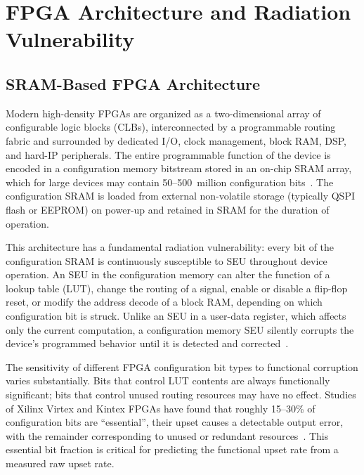 \section{FPGA Architecture and Radiation Vulnerability}
\label{sec:FPGA_arch}

\subsection{SRAM-Based FPGA Architecture}

Modern high-density FPGAs are organized as a two-dimensional array
of configurable logic blocks (CLBs), interconnected by a programmable
routing fabric and surrounded by dedicated I/O, clock management,
block RAM, DSP, and hard-IP peripherals.  The entire programmable
function of the device is encoded in a configuration memory bitstream
stored in an on-chip SRAM array, which for large devices may contain
50--500~million configuration bits~\cite{kuon2008fpga}.  The
configuration SRAM is loaded from external non-volatile storage
(typically QSPI flash or EEPROM) on power-up and retained in SRAM
for the duration of operation.

This architecture has a fundamental radiation vulnerability: every
bit of the configuration SRAM is continuously susceptible to SEU
throughout device operation.  An SEU in the configuration memory
can alter the function of a lookup table (LUT), change the routing
of a signal, enable or disable a flip-flop reset, or modify the
address decode of a block RAM, depending on which configuration
bit is struck.  Unlike an SEU in a user-data register, which affects
only the current computation, a configuration memory SEU silently
corrupts the device's programmed behavior until it is detected and
corrected~\cite{kastensmidt2014survey}.

The sensitivity of different FPGA configuration bit types to
functional corruption varies substantially.  Bits that control
LUT contents are always functionally significant; bits that control
unused routing resources may have no effect.  Studies of Xilinx
Virtex and Kintex FPGAs have found that roughly 15--30\% of
configuration bits are ``essential'', their upset causes a
detectable output error, with the remainder corresponding to
unused or redundant resources~\cite{quinn2007review,lee2014kintex}.
This essential bit fraction is critical for predicting the
functional upset rate from a measured raw upset rate.

